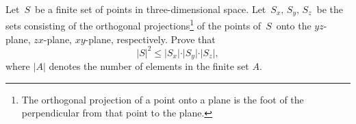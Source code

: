 Let $\,S\,$ be a finite set of points in three-dimensional space. Let $\,S_{x},\,S_{y},\,S_{z}\,$ be the sets consisting of the orthogonal projections\footnote{The orthogonal projection of a point onto a plane is the foot of the perpendicular from that point to the plane.} of the points of $\,S\,$ onto the $yz$-plane, $zx$-plane, $xy$-plane, respectively. Prove that \[ \vert S\vert^{2}\leq \vert S_{x} \vert \cdot \vert S_{y} \vert \cdot \vert S_{z} \vert,  \] where $\vert A \vert$ denotes the number of elements in the finite set $A$. 
